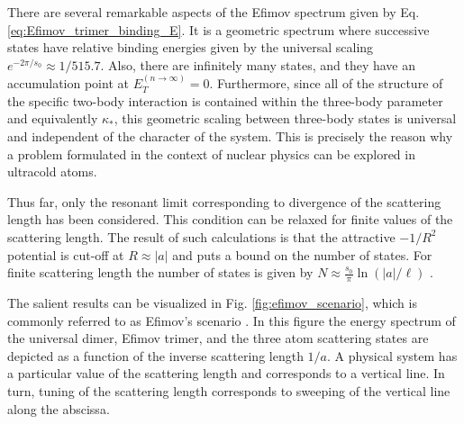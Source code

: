 \documentclass[prl,onecolumn,amsmath,amssymb,titlepage,nofootinbib,preprint]{revtex4-1}
\begin{document}
	There are several remarkable aspects of the Efimov spectrum given by Eq. \ref{eq:Efimov_trimer_binding_E}.  It is a geometric spectrum where successive states have relative binding energies given by the universal scaling $e^{-2\pi/s_{0}}\approx 1/515.7$.  Also, there are infinitely many states, and they have an accumulation point at $E_{T}^{(n\rightarrow\infty)}=0$. Furthermore, since all of the structure of the specific two-body interaction is contained within the three-body parameter and equivalently $\kappa_{*}$, this geometric scaling between three-body states is universal and independent of the character of the system.  This is precisely the reason why a problem formulated in the context of nuclear physics can be explored in ultracold atoms.
	
	Thus far, only the resonant limit corresponding to divergence of the scattering length has been considered.  This condition can be relaxed for finite values of the scattering length.  The result of such calculations \cite{Fedorov1993}\cite{Braaten_2006}\cite{Braaten2008}\cite{Nielsen2001} is that the attractive $-1/R^{2}$ potential is cut-off at $R\approx |a|$ and puts a bound on the number of states. For finite scattering length the number of states is given by $N\approx\frac{s_{0}}{\pi}\ln(|a|/\ell)$\cite{Efimov1970} \cite{Efimov1971}.
	

	
	The salient results can be visualized in Fig. \ref{fig:efimov_scenario}, which is commonly referred to as Efimov's scenario \cite{Efimov1970}\cite{Ferlaino2011}\cite{Kraemer2006_1st_observ}. In this figure the energy spectrum of the universal dimer, Efimov trimer, and the three atom scattering states are depicted as a function of the inverse scattering length $1/a$.  A physical system has a particular value of the scattering length and corresponds to a vertical line.  In turn, tuning of the scattering length corresponds to sweeping of the vertical line along the abscissa. 
	
\end{document}
